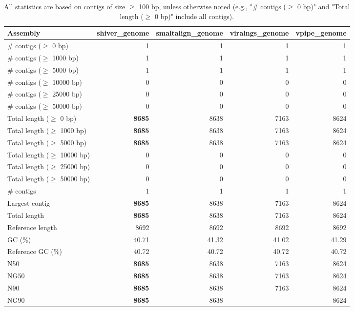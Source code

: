 \documentclass[12pt,a4paper]{article}
\begin{document}
\begin{table}[ht]
\begin{center}
\caption{All statistics are based on contigs of size $\geq$ 100 bp, unless otherwise noted (e.g., "\# contigs ($\geq$ 0 bp)" and "Total length ($\geq$ 0 bp)" include all contigs).}
\begin{tabular}{|l*{4}{|r}|}
\hline
Assembly & shiver\_genome & smaltalign\_genome & viralngs\_genome & vpipe\_genome \\ \hline
\# contigs ($\geq$ 0 bp) & 1 & 1 & 1 & 1 \\ \hline
\# contigs ($\geq$ 1000 bp) & 1 & 1 & 1 & 1 \\ \hline
\# contigs ($\geq$ 5000 bp) & 1 & 1 & 1 & 1 \\ \hline
\# contigs ($\geq$ 10000 bp) & 0 & 0 & 0 & 0 \\ \hline
\# contigs ($\geq$ 25000 bp) & 0 & 0 & 0 & 0 \\ \hline
\# contigs ($\geq$ 50000 bp) & 0 & 0 & 0 & 0 \\ \hline
Total length ($\geq$ 0 bp) & {\bf 8685} & 8638 & 7163 & 8624 \\ \hline
Total length ($\geq$ 1000 bp) & {\bf 8685} & 8638 & 7163 & 8624 \\ \hline
Total length ($\geq$ 5000 bp) & {\bf 8685} & 8638 & 7163 & 8624 \\ \hline
Total length ($\geq$ 10000 bp) & 0 & 0 & 0 & 0 \\ \hline
Total length ($\geq$ 25000 bp) & 0 & 0 & 0 & 0 \\ \hline
Total length ($\geq$ 50000 bp) & 0 & 0 & 0 & 0 \\ \hline
\# contigs & 1 & 1 & 1 & 1 \\ \hline
Largest contig & {\bf 8685} & 8638 & 7163 & 8624 \\ \hline
Total length & {\bf 8685} & 8638 & 7163 & 8624 \\ \hline
Reference length & 8692 & 8692 & 8692 & 8692 \\ \hline
GC (\%) & 40.71 & 41.32 & 41.02 & 41.29 \\ \hline
Reference GC (\%) & 40.72 & 40.72 & 40.72 & 40.72 \\ \hline
N50 & {\bf 8685} & 8638 & 7163 & 8624 \\ \hline
NG50 & {\bf 8685} & 8638 & 7163 & 8624 \\ \hline
N90 & {\bf 8685} & 8638 & 7163 & 8624 \\ \hline
NG90 & {\bf 8685} & 8638 & - & 8624 \\ \hline

\end{tabular}
\end{center}
\end{table}
\end{document}
